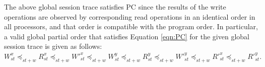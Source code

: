 \documentclass[conference]{IEEEtran}
\begin{document}
	
	The above global session trace satisfies PC %
	since the results of the write operations are observed by corresponding read operations in an identical order in all processors, and that order is compatible with the program order. In particular, a valid global partial order that satisfies Equation \ref{eqn:PC} for the given global session trace is given as follows: 
	$W^x_{\mathit{st}}  \preccurlyeq_{\mathit{st}+w} R^x_{\mathit{st}} \preccurlyeq_{\mathit{st}+w} W'^x_{\mathit{st}} \preccurlyeq_{\mathit{st}+w} W^y_{\mathit{st}} \preccurlyeq_{\mathit{st}+w}   R^y_{\mathit{st}} \preccurlyeq_{\mathit{st}+w} W'^y_{\mathit{st}}   \preccurlyeq_{\mathit{st}+w} R'^x_{\mathit{st}} \preccurlyeq_{\mathit{st}+w} R'^y_{\mathit{st}} .$ 
	
\end{document}
